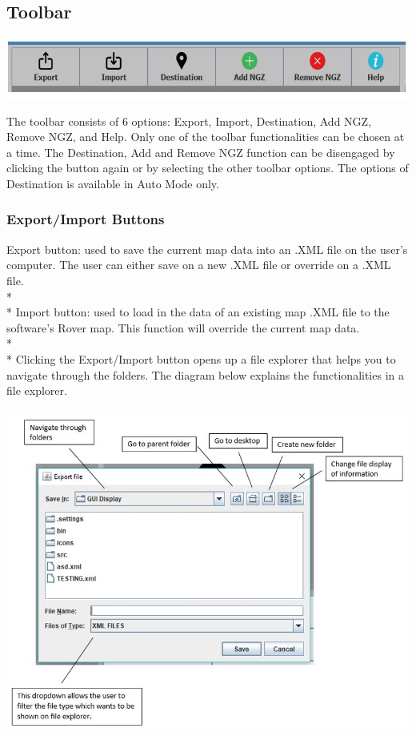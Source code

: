 \documentclass[12pt]{article}
\begin{document}
	\subsection{Toolbar}
		\begin{center}
		\includegraphics[scale=1]{ToolBar.jpg}
		\end{center}	
The toolbar consists of 6 options: Export, Import, Destination, Add NGZ, Remove NGZ, and Help. Only one of the toolbar functionalities can be chosen at a time. The Destination, Add and Remove NGZ function can be disengaged by clicking the button again or by selecting the other toolbar options. The options of Destination is available in Auto Mode only.

	\subsubsection{Export/Import Buttons}
Export button: used to save the current map data into an .XML file on the user’s computer. The user can either save on a new .XML file or override on a .XML file. 
\\*
\\*
Import button: used to load in the data of an existing map .XML file to the software’s Rover map. This function will override the current map data.
\\*
\\*
Clicking the Export/Import button opens up a file explorer that helps you to navigate through the folders. The diagram below explains the functionalities in a file explorer.
		\begin{center}
		\includegraphics[scale=1]{FileExplorer.jpg}
		\end{center}
	
\end{document}

